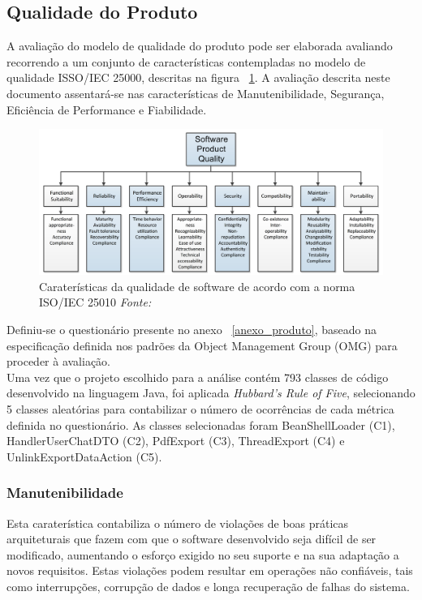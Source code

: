 \documentclass[openany,10pt,a4paper]{article}
\begin{document}
\subsection{Qualidade do Produto}
A avaliação do modelo de qualidade do produto pode ser elaborada avaliando recorrendo a um conjunto de características contempladas no modelo de qualidade ISSO/IEC 25000, descritas na figura ~\ref{fig_quality}. A avaliação descrita neste documento assentará-se nas características de Manutenibilidade, Segurança, Eficiência de Performance e Fiabilidade.

\begin{figure}[h]
	\centering
	\includegraphics[width=1\linewidth]{quality.PNG}
	\caption{Caraterísticas da qualidade de software de acordo com a norma ISO/IEC 25010 \small{\textit{Fonte: 	\cite{OMG_Performance}}}}
	\label{fig_quality}
\end{figure}

Definiu-se o questionário presente no anexo ~\ref{anexo_produto}, baseado na especificação definida nos padrões da Object Management Group (OMG) para proceder à avaliação. \\
Uma vez que o projeto escolhido para a análise contém 793 classes de código desenvolvido na linguagem Java, foi aplicada 
\textit{Hubbard’s Rule of Five}, selecionando 5 classes aleatórias para contabilizar o número de ocorrências de cada métrica definida no questionário. As classes selecionadas foram BeanShellLoader (C1), HandlerUserChatDTO (C2), PdfExport (C3), ThreadExport (C4) e UnlinkExportDataAction (C5).

\subsubsection{Manutenibilidade}
Esta caraterística contabiliza o número de violações de boas práticas arquiteturais que fazem com que o software desenvolvido seja difícil de ser modificado, aumentando o esforço exigido no seu suporte e na sua adaptação a novos requisitos. Estas violações podem resultar em operações não confiáveis, tais como interrupções, corrupção de dados e longa recuperação de falhas do sistema. \cite{OMG_Maintainability}
\end{document}
